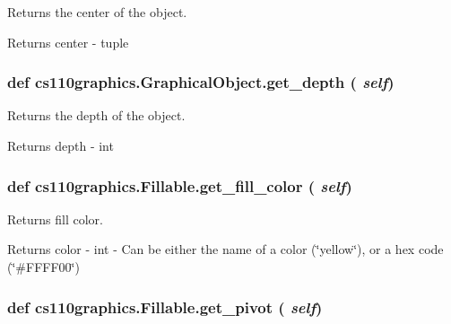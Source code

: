 Returns the center of the object. \begin{DoxyReturn}{Returns}
center -\/ tuple 
\end{DoxyReturn}
\hypertarget{classcs110graphics_1_1GraphicalObject_a6d9f5718cd0cf249e0d2842971bae17f}{
\subsubsection[{get\_\-depth}]{\setlength{\rightskip}{0pt plus 5cm}def cs110graphics.GraphicalObject.get\_\-depth ( {\em self})}}
\label{classcs110graphics_1_1GraphicalObject_a6d9f5718cd0cf249e0d2842971bae17f}


Returns the depth of the object. \begin{DoxyReturn}{Returns}
depth -\/ int 
\end{DoxyReturn}
\hypertarget{classcs110graphics_1_1Fillable_a16c045bc9b63961b696914ee1a1d14d9}{
\subsubsection[{get\_\-fill\_\-color}]{\setlength{\rightskip}{0pt plus 5cm}def cs110graphics.Fillable.get\_\-fill\_\-color ( {\em self})}}
\label{classcs110graphics_1_1Fillable_a16c045bc9b63961b696914ee1a1d14d9}


Returns fill color. \begin{DoxyReturn}{Returns}
color -\/ int -\/ Can be either the name of a color (\char`\"{}yellow\char`\"{}), or a hex code (\char`\"{}\#FFFF00\char`\"{}) 
\end{DoxyReturn}
\hypertarget{classcs110graphics_1_1Fillable_a514fa0d21297c1372681afae9219fd58}{
\subsubsection[{get\_\-pivot}]{\setlength{\rightskip}{0pt plus 5cm}def cs110graphics.Fillable.get\_\-pivot ( {\em self})}}
\label{classcs110graphics_1_1Fillable_a514fa0d21297c1372681afae9219fd58}


